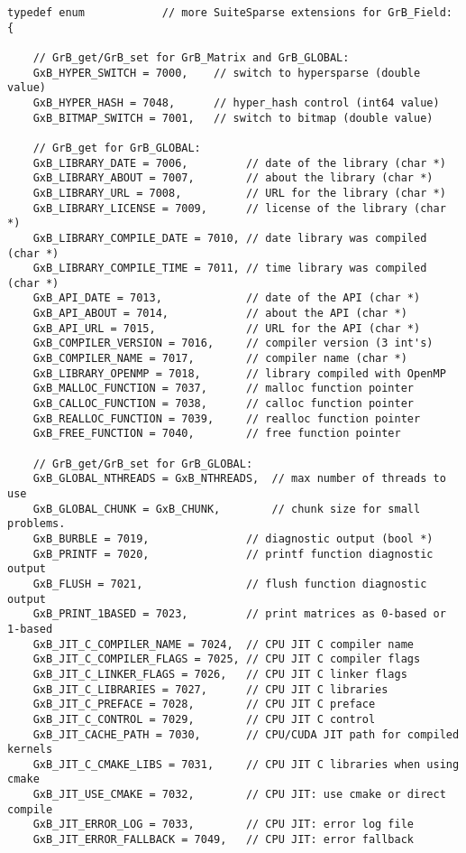 {\begin{verbatim}
typedef enum            // more SuiteSparse extensions for GrB_Field:
{

    // GrB_get/GrB_set for GrB_Matrix and GrB_GLOBAL:
    GxB_HYPER_SWITCH = 7000,    // switch to hypersparse (double value)
    GxB_HYPER_HASH = 7048,      // hyper_hash control (int64 value)
    GxB_BITMAP_SWITCH = 7001,   // switch to bitmap (double value)

    // GrB_get for GrB_GLOBAL:
    GxB_LIBRARY_DATE = 7006,         // date of the library (char *)
    GxB_LIBRARY_ABOUT = 7007,        // about the library (char *)
    GxB_LIBRARY_URL = 7008,          // URL for the library (char *)
    GxB_LIBRARY_LICENSE = 7009,      // license of the library (char *)
    GxB_LIBRARY_COMPILE_DATE = 7010, // date library was compiled (char *)
    GxB_LIBRARY_COMPILE_TIME = 7011, // time library was compiled (char *)
    GxB_API_DATE = 7013,             // date of the API (char *)
    GxB_API_ABOUT = 7014,            // about the API (char *)
    GxB_API_URL = 7015,              // URL for the API (char *)
    GxB_COMPILER_VERSION = 7016,     // compiler version (3 int's)
    GxB_COMPILER_NAME = 7017,        // compiler name (char *)
    GxB_LIBRARY_OPENMP = 7018,       // library compiled with OpenMP
    GxB_MALLOC_FUNCTION = 7037,      // malloc function pointer
    GxB_CALLOC_FUNCTION = 7038,      // calloc function pointer
    GxB_REALLOC_FUNCTION = 7039,     // realloc function pointer
    GxB_FREE_FUNCTION = 7040,        // free function pointer

    // GrB_get/GrB_set for GrB_GLOBAL:
    GxB_GLOBAL_NTHREADS = GxB_NTHREADS,  // max number of threads to use
    GxB_GLOBAL_CHUNK = GxB_CHUNK,        // chunk size for small problems.
    GxB_BURBLE = 7019,               // diagnostic output (bool *)
    GxB_PRINTF = 7020,               // printf function diagnostic output
    GxB_FLUSH = 7021,                // flush function diagnostic output
    GxB_PRINT_1BASED = 7023,         // print matrices as 0-based or 1-based
    GxB_JIT_C_COMPILER_NAME = 7024,  // CPU JIT C compiler name
    GxB_JIT_C_COMPILER_FLAGS = 7025, // CPU JIT C compiler flags
    GxB_JIT_C_LINKER_FLAGS = 7026,   // CPU JIT C linker flags
    GxB_JIT_C_LIBRARIES = 7027,      // CPU JIT C libraries
    GxB_JIT_C_PREFACE = 7028,        // CPU JIT C preface
    GxB_JIT_C_CONTROL = 7029,        // CPU JIT C control
    GxB_JIT_CACHE_PATH = 7030,       // CPU/CUDA JIT path for compiled kernels
    GxB_JIT_C_CMAKE_LIBS = 7031,     // CPU JIT C libraries when using cmake
    GxB_JIT_USE_CMAKE = 7032,        // CPU JIT: use cmake or direct compile
    GxB_JIT_ERROR_LOG = 7033,        // CPU JIT: error log file
    GxB_JIT_ERROR_FALLBACK = 7049,   // CPU JIT: error fallback


\end{verbatim}}
